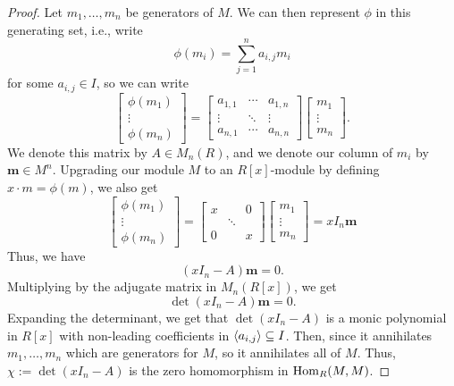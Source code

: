 \documentclass[12pt]{article}
\begin{document}
\begin{proof}
    Let $m_1,\dots,m_n$ be generators of $M$. We can then represent $\phi$ in this generating set, i.e., write
    \[\phi(m_i) = \sum_{j=1}^n a_{i, j} m_i\]
    for some $a_{i,j} \in I$, so we can write
    \[
        \begin{bmatrix}
            \phi(m_1)\\ \vdots \\ \phi(m_n)
        \end{bmatrix} =
        \begin{bmatrix}
            a_{1,1} & \cdots & a_{1,n}\\
            \vdots & \ddots & \vdots\\
            a_{n,1} & \cdots & a_{n,n}
        \end{bmatrix}
        \begin{bmatrix}
            m_1\\ \vdots \\ m_n
        \end{bmatrix}.
    \]
    We denote this matrix by $A \in M_n(R)$, and we denote our column of $m_i$ by $\mathbf{m} \in M^n$. Upgrading our module $M$ to an $R[x]$-module by defining $x\cdot m = \phi(m)$, we also get
    \[
        \begin{bmatrix}
            \phi(m_1)\\ \vdots \\ \phi(m_n)
        \end{bmatrix} =
        \begin{bmatrix}
            x &  & 0 \\
             & \ddots & \\
            0 &  & x
        \end{bmatrix}
        \begin{bmatrix}
            m_1\\ \vdots \\ m_n
        \end{bmatrix} = xI_n \mathbf{m}
    \]
    Thus, we have
    \[(xI_n - A)\mathbf{m} = 0.\]
    Multiplying by the adjugate matrix in $M_n(R[x])$, we get
    \[\det(xI_n - A)\mathbf{m} = 0.\]
    Expanding the determinant, we get that $\det(xI_n - A)$ is a monic polynomial in $R[x]$ with non-leading coefficients in $\left\langle a_{i,j}\right\rangle \subseteq I$. Then, since it annihilates $m_1,\dots,m_n$ which are generators for $M$, so it annihilates all of $M$. Thus, $\chi := \det(xI_n - A)$ is the zero homomorphism in $\mathrm{Hom}_R(M,M)$.
\end{proof}
\end{document}
